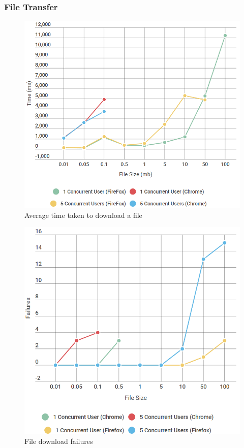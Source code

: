 \documentclass[]{report}
\begin{document}
			\subsubsection{File Transfer}
			\begin{figure}[H]
				\caption{Average time taken to download a file}
				\centering
				\includegraphics[scale=0.5]{download-chart.png}
			\end{figure}
			\begin{figure}[H]
				\caption{File download failures}
				\centering
				\includegraphics[scale=0.5]{download-failures-chart.png}
			\end{figure}
		
\end{document}
